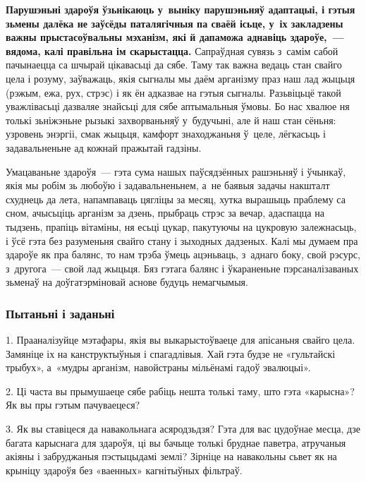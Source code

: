 \textbf{Парушэньні здароўя ўзьнікаюць у~выніку парушэньняў адаптацыі, і гэтыя зьмены далёка не заўсёды паталягічныя па сваёй ісьце, у~іх закладзены важны прыстасоўвальны мэханізм, які й дапаможа аднавіць здароўе,~--- вядома, калі правільна ім скарыстацца.} Сапраўдная сувязь з~самім сабой пачынаецца са шчырай цікавасьці да сябе. Таму так важна ведаць стан свайго цела і розуму, заўважаць, якія сыгналы мы даём арганізму праз наш лад жыцьця (рэжым, ежа, рух, стрэс) і як ён адказвае на гэтыя сыгналы. Разьвіцьцё такой уважлівасьці дазваляе знайсьці для сябе аптымальныя ўмовы. Бо нас хвалюе ня толькі зьніжэньне рызыкі захворваньняў у~будучыні, але й наш стан сёньня: узровень энэргіі, смак жыцьця, камфорт знаходжаньня ў~целе, лёгкасьць і задавальненьне ад кожнай пражытай гадзіны.

Умацаваньне здароўя~--- гэта сума нашых паўсядзённых рашэньняў і ўчынкаў, якія мы робім зь любоўю і задавальненьнем, а~не баявыя задачы накшталт схуднець да лета, напампаваць цягліцы за месяц, хутка вырашыць праблему са сном, ачысьціць арганізм за дзень, прыбраць стрэс за вечар, адаспацца на тыдзень, прапіць вітаміны, ня есьці цукар, пакутуючы на цукровую залежнасьць, і ўсё гэта без разуменьня свайго стану і зыходных дадзеных. Калі мы думаем пра здароўе як пра балянс, то нам трэба ўмець ацэньваць, з~аднаго боку, свой рэсурс, з~другога~--- свой лад жыцьця. Бяз гэтага балянс і ўкараненьне пэрсаналізаваных зьменаў на доўгатэрміновай аснове будуць немагчымыя.


\subsubsection{Пытаньні і заданьні}

1. Прааналізуйце мэтафары, якія вы выкарыстоўваеце для апісаньня свайго цела. Замяніце іх на канструктыўныя і спагадлівыя. Хай гэта будзе не «гультайскі трыбух», а~«мудры арганізм, навойстраны мільёнамі гадоў эвалюцыі».

2. Ці часта вы прымушаеце сябе рабіць нешта толькі таму, што гэта «карысна»? Як вы пры гэтым пачуваецеся?

3. Як вы ставіцеся да навакольнага асяродзьдзя? Гэта для вас цудоўнае месца, дзе багата карыснага для здароўя, ці вы бачыце толькі бруднае паветра, атручаныя акіяны і забруджаныя пэстыцыдамі землі? Зірніце на навакольны сьвет як на крыніцу здароўя без «ваенных» кагнітыўных фільтраў.


